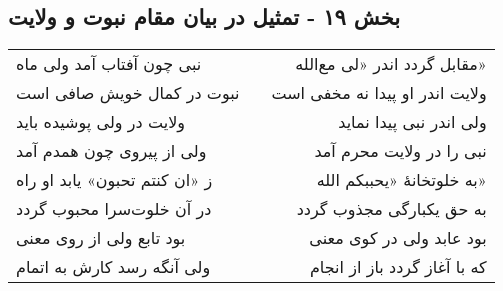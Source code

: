 \begin{center}
\section*{بخش ۱۹ - تمثیل در بیان مقام نبوت و ولایت}
\label{sec:sh019}
\begin{longtable}{l p{0.5cm} r}
نبی چون آفتاب آمد ولی ماه
&&
مقابل گردد اندر «لی مع‌الله»
\\
نبوت در کمال خویش صافی است
&&
ولایت اندر او پیدا نه مخفی است
\\
ولایت در ولی پوشیده باید
&&
ولی اندر نبی پیدا نماید
\\
ولی از پیروی چون همدم آمد
&&
نبی را در ولایت محرم آمد
\\
ز «ان کنتم تحبون» یابد او راه
&&
به خلوتخانهٔ «یحببکم الله»
\\
در آن خلوت‌سرا محبوب گردد
&&
به حق یکبارگی مجذوب گردد
\\
بود تابع ولی از روی معنی
&&
بود عابد ولی در کوی معنی
\\
ولی آنگه رسد کارش به اتمام
&&
که با آغاز گردد باز از انجام
\\
\end{longtable}
\end{center}
